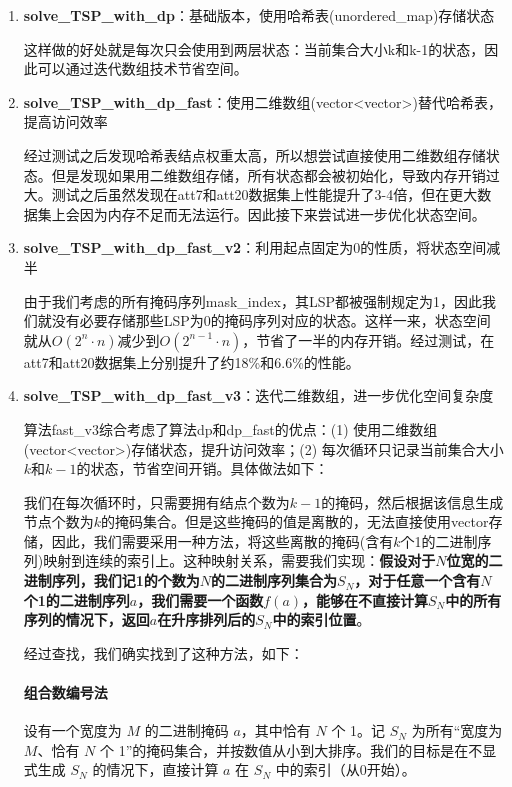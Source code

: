 \documentclass[UTF8,12pt,a4paper]{ctexart}
\begin{document}
\begin{enumerate}
	\item \textbf{solve\_TSP\_with\_dp}：基础版本，使用哈希表(unordered\_map)存储状态
	
	这样做的好处就是每次只会使用到两层状态：当前集合大小k和k-1的状态，因此可以通过迭代数组技术节省空间。

	\item \textbf{solve\_TSP\_with\_dp\_fast}：使用二维数组(vector<vector>)替代哈希表，提高访问效率
	
	经过测试之后发现哈希表结点权重太高，所以想尝试直接使用二维数组存储状态。但是发现如果用二维数组存储，所有状态都会被初始化，导致内存开销过大。测试之后虽然发现在att7和att20数据集上性能提升了3-4倍，但在更大数据集上会因为内存不足而无法运行。因此接下来尝试进一步优化状态空间。

	\item \textbf{solve\_TSP\_with\_dp\_fast\_v2}：利用起点固定为0的性质，将状态空间减半
	
	由于我们考虑的所有掩码序列mask\_index，其LSP都被强制规定为1，因此我们就没有必要存储那些LSP为0的掩码序列对应的状态。这样一来，状态空间就从$O(2^n \cdot n)$减少到$O(2^{n-1} \cdot n)$，节省了一半的内存开销。经过测试，在att7和att20数据集上分别提升了约18\%和6.6\%的性能。

	\item \textbf{solve\_TSP\_with\_dp\_fast\_v3}：迭代二维数组，进一步优化空间复杂度

	算法fast\_v3综合考虑了算法dp和dp\_fast的优点：(1) 使用二维数组(vector<vector>)存储状态，提升访问效率；(2) 每次循环只记录当前集合大小$k$和$k-1$的状态，节省空间开销。具体做法如下：

	我们在每次循环时，只需要拥有结点个数为$k-1$的掩码，然后根据该信息生成节点个数为$k$的掩码集合。但是这些掩码的值是离散的，无法直接使用vector存储，因此，我们需要采用一种方法，将这些离散的掩码(含有$k$个1的二进制序列)映射到连续的索引上。这种映射关系，需要我们实现：\textbf{假设对于$N$位宽的二进制序列，我们记1的个数为$N$的二进制序列集合为$S_N$，对于任意一个含有$N$个1的二进制序列$a$，我们需要一个函数$f(a)$，能够在不直接计算$S_N$中的所有序列的情况下，返回$a$在升序排列后的$S_N$中的索引位置}。

	经过查找，我们确实找到了这种方法，如下：

	\paragraph{组合数编号法}
	设有一个宽度为 $M$ 的二进制掩码 $a$，其中恰有 $N$ 个 1。记 $S_N$ 为所有“宽度为 $M$、恰有 $N$ 个 1”的掩码集合，并按数值从小到大排序。我们的目标是在不显式生成 $S_N$ 的情况下，直接计算 $a$ 在 $S_N$ 中的索引（从0开始）。


\end{enumerate}
\end{document}
